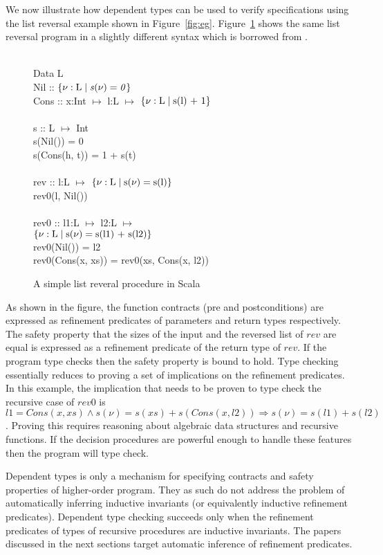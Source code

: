 We now illustrate how dependent types can be used to verify specifications using 
the list reversal example shown in Figure~\ref{fig:eg}.
Figure~\ref{fig:deptypes-eg} shows the same list reversal program 
in a slightly different syntax which is borrowed from \cite{rjhala:ESOP13}.
%
\begin{figure}
\begin{myprogram}
\\
\pnl Data L \\
\pnl \>   Nil :: $\mathit{\{ \nu:\text{L} \; | \; s(\nu) = 0\}}$  \\
\pnl \>   Cons :: x:Int $\mapsto$ l:L $\mapsto$ 
				$\mathit{\{ \nu:\text{L} \; | \; \text{s(l) + 1}\}}$ \\
\\
\pnl s :: L $\mapsto$ Int \\
\pnl \>    s(Nil()) = 0 \\
\pnl \>    s(Cons(h, t)) = 1 + s(t) \\
\\
\pnl rev :: l:L $\mapsto$ $\mathit{\{ \nu:\text{L} \; | \; \text{s}(\nu) = \text{s(l)}\}}$ \\
\pnl \> rev0(l, Nil())  \\
\\    
\pnl rev0 :: l1:L $\mapsto$ l2:L $\mapsto$  \\
\> \> \> \> \> $\mathit{\{ \nu:\text{L} \; | \; \text{s}(\nu) = \text{s(l1) + s(l2)}\}}$  \\
\pnl \> rev0(Nil()) = l2 \\
\pnl \> rev0(Cons(x, xs)) = rev0(xs, Cons(x, l2))
\end{myprogram}
\caption{A simple list reveral procedure in Scala} \label{fig:deptypes-eg}
\end{figure}
%
As shown in the figure, the function contracts (pre and postconditions) are expressed as refinement predicates of parameters and return types respectively. 
The safety property that the sizes of the input and the reversed list of $rev$ are equal is expressed as a refinement predicate of the return type of $rev$. If the 
program type checks then the safety property is bound to hold.
Type checking essentially reduces to proving a set of implications on the refinement predicates. In this example, the implication that needs to be proven to type check the recursive case of $rev0$ is $l1 = Cons(x,xs) \wedge s(\nu) = s(xs) + s(Cons(x,l2)) \Rightarrow s(\nu) = s(l1) + s(l2)$.
Proving this requires reasoning about algebraic data structures and recursive functions. If the decision procedures are powerful enough to handle these features then the program will type check.

Dependent types is only a mechanism for specifying contracts and safety properties of higher-order program. They as such do not address the problem of automatically inferring inductive invariants (or equivalently inductive refinement predicates). Dependent type checking succeeds only when the refinement predicates of types of recursive procedures are inductive invariants. The papers discussed in the next sections target automatic inference of refinement predicates.